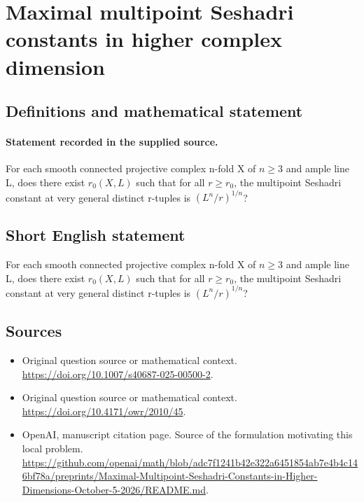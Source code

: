 \documentclass[11pt]{article}
\begin{document}
\section*{Maximal multipoint Seshadri constants in higher complex dimension}\label{30007044}
\subsection{Definitions and mathematical statement}
\paragraph{Statement recorded in the supplied source.}
For each smooth connected projective complex n-fold X of $n\geq 3$ and ample line L, does there exist $r_{0}(X,L)$ such that for all $r\geq r_{0}$, the multipoint Seshadri constant at very general distinct r-tuples is $(L^n/r)^{1/n}$?
\subsection{Short English statement}
For each smooth connected projective complex n-fold X of $n\geq 3$ and ample line L, does there exist $r_{0}(X,L)$ such that for all $r\geq r_{0}$, the multipoint Seshadri constant at very general distinct r-tuples is $(L^n/r)^{1/n}$?
\subsection{Sources}
\begin{itemize}
\item[S1] Original question source or mathematical context.
\url{https://doi.org/10.1007/s40687-025-00500-2}.
\item[S2] Original question source or mathematical context.
\url{https://doi.org/10.4171/owr/2010/45}.
\item[S3] OpenAI, manuscript citation page. Source of the formulation motivating this local problem.
\url{https://github.com/openai/math/blob/adc7f1241b42e322a6451854ab7e4b4c146bf78a/preprints/Maximal-Multipoint-Seshadri-Constants-in-Higher-Dimensions-October-5-2026/README.md}.
\end{itemize}
\end{document}
